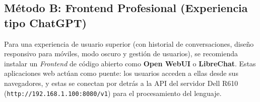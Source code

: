 \documentclass[12pt,a4paper]{article}
\begin{document}
\subsection{Método B: Frontend Profesional (Experiencia tipo ChatGPT)}
Para una experiencia de usuario superior (con historial de conversaciones, diseño responsivo para móviles, modo oscuro y gestión de usuarios), se recomienda instalar un \textit{Frontend} de código abierto como \textbf{Open WebUI} o \textbf{LibreChat}. 
Estas aplicaciones web actúan como puente: los usuarios acceden a ellas desde sus navegadores, y estas se conectan por detrás a la API del servidor Dell R610 (\texttt{http://192.168.1.100:8080/v1}) para el procesamiento del lenguaje.
\end{document}
